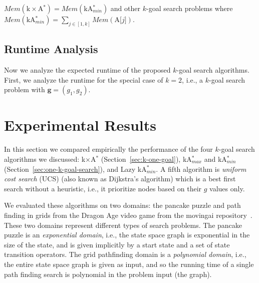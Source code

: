 \documentclass{aicom2e}
\newcommand{\kgs}{$k$-goal search}
\newcommand{\astar}{A$^*$}
\newcommand{\kastar}{kA$^*$}
\newcommand{\kastarmin}{kA$^*_{min}$}
\newcommand{\kastarmax}{kA$^*_{max}$}
\newcommand{\kxastar}{k$\times$A$^*$}
\newcommand{\astari}[1]{A[$#1$]}
\newcommand{\minf}{Min-f}
\begin{document}
$Mem(\text{\kxastar{}}) = Mem(\text{\kastarmin{}})$ and other \kgs{} problems where 
$Mem(\text{\kastarmin{}}) = \sum_{j\in[1,k]} Mem(\text{\astari{j}})$. 



\subsection{Runtime Analysis}
Now we analyze the expected runtime of the proposed \kgs{} algorithms. 
First, we analyze the runtime for the special case of $k=2$, i.e., a \kgs{} problem with $\textbf{g}=(g_1,g_2)$. 







\section{Experimental Results}



In this section we compared empirically the performance of the four \kgs{}
algorithms we discussed: 
\kxastar{} (Section~\ref{sec:k-one-goal}), 
\kastarmax{} and \kastarmin{}(Section~\ref{sec:one-k-goal-search}),  
and Lazy \kastarmin{}. A fifth algorithm is {\em uniform cost search} (UCS) (also known
as Dijkstra's algorithm) which is a best first search without a heuristic,
i.e., it prioritize nodes based on their $g$ values only.


We evaluated these algorithms on two domains: the pancake puzzle and path finding in grids from the Dragon Age video game from the movingai repository~\cite{sturtevant2012benchmarks}. These two domains represent different types of search problems. The pancake puzzle is an {\em exponential domain}, i.e., the state space graph is exponential in the size of the state, and is given implicitly by a start state and a set of state transition operators. The grid pathfinding domain is a {\em polynomial domain}, i.e., the entire state space graph is given as input, and so the running time of a single path finding search is polynomial in the problem input (the graph). 
\end{document}
